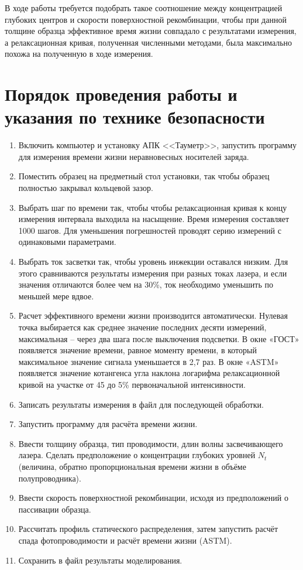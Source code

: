 В ходе работы требуется подобрать такое соотношение между концентрацией глубоких центров и скорости поверхностной рекомбинации, чтобы при данной толщине образца эффективное время жизни совпадало с результатами измерения, а релаксационная кривая, полученная численными методами, была максимально похожа на полученную в ходе измерения.

\section{Порядок проведения работы и указания по технике безопасности}

\begin{enumerate}
\item Включить компьютер и установку АПК <<Тауметр>>, запустить программу для измерения времени жизни неравновесных носителей заряда.
\item Поместить образец на предметный стол установки, так чтобы образец полностью закрывал кольцевой зазор.
\item Выбрать шаг по времени так, чтобы чтобы релаксационная кривая к концу измерения интервала выходила на насыщение. Время измерения составляет 1000 шагов. Для уменьшения погрешностей проводят серию измерений с одинаковыми параметрами.
\item Выбрать ток засветки так, чтобы уровень инжекции оставался низким. Для этого сравниваются результаты измерения при разных токах лазера, и если значения отличаются более чем на 30\%, ток необходимо уменьшить по меньшей мере вдвое.
\item Расчет эффективного времени жизни производится автоматически. Нулевая точка выбирается как среднее значение последних десяти измерений, максимальная – через два шага после выключения подсветки. В окне «ГОСТ» появляется значение времени, равное моменту времени, в который максимальное значение сигнала уменьшается в 2,7 раз. В окне «ASTM» появляется значение котангенса угла наклона логарифма релаксационной кривой на участке от 45 до 5\% первоначальной интенсивности.
\item Записать результаты измерения в файл для последующей обработки.
\item Запустить программу для расчёта времени жизни.
\item Ввести толщину образца, тип проводимости, длин волны засвечивающего лазера. Сделать предположение о концентрации глубоких уровней $N_{t}$ (величина, обратно пропорциональная времени жизни в объёме полупроводника).
\item Ввести скорость поверхностной рекомбинации, исходя из предположений о пассивации образца.
\item Рассчитать профиль статического распределения, затем запустить расчёт спада фотопроводимости и расчёт времени жизни (ASTM).
\item Сохранить в файл результаты моделирования.
\end{enumerate}

